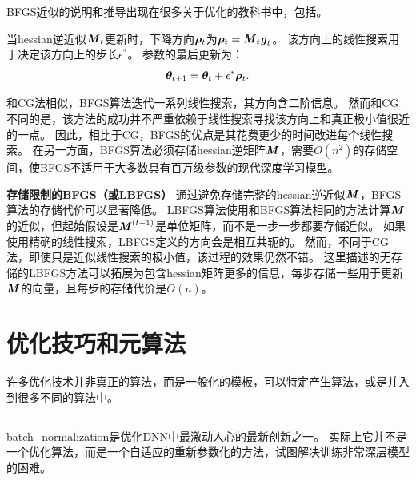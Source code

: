 
\gls{BFGS}近似的说明和推导出现在很多关于优化的教科书中，包括\cite{Lue84}。

当\gls{hessian}逆近似$\boldsymbol{\mathit{M}}_t$更新时，下降方向$\boldsymbol{\rho}_t$为$\boldsymbol{\rho}_t = \boldsymbol{\mathit{M}}_t \boldsymbol{\mathit{g}}_t$。
该方向上的线性搜索用于决定该方向上的步长$\epsilon^*$。
参数的最后更新为：
\begin{equation}
    \boldsymbol{\theta}_{t+1} = \boldsymbol{\theta}_t + \epsilon^* \boldsymbol{\rho}_t.
\end{equation}

和\gls{CG}法相似，\gls{BFGS}算法迭代一系列线性搜索，其方向含二阶信息。
然而和\gls{CG}不同的是，该方法的成功并不严重依赖于线性搜索寻找该方向上和真正极小值很近的一点。
因此，相比于\gls{CG}，\gls{BFGS}的优点是其花费更少的时间改进每个线性搜索。
在另一方面，\gls{BFGS}算法必须存储\gls{hessian}逆矩阵$\boldsymbol{\mathit{M}}$，需要$O(n^2)$的存储空间，使\gls{BFGS}不适用于大多数具有百万级参数的现代深度学习模型。

\textbf{存储限制的\gls{BFGS}（或\gls{LBFGS}）}
通过避免存储完整的\gls{hessian}逆近似$\boldsymbol{\mathit{M}}$，\gls{BFGS}算法的存储代价可以显著降低。
\gls{LBFGS}算法使用和\gls{BFGS}算法相同的方法计算$\boldsymbol{\mathit{M}}$的近似，但起始假设是$\boldsymbol{\mathit{M}}^{(t-1)}$是单位矩阵，而不是一步一步都要存储近似。
如果使用精确的线性搜索，\gls{LBFGS}定义的方向会是相互共轭的。
然而，不同于\gls{CG}法，即使只是近似线性搜索的极小值，该过程的效果仍然不错。
这里描述的无存储的\gls{LBFGS}方法可以拓展为包含\gls{hessian}矩阵更多的信息，每步存储一些用于更新$\boldsymbol{\mathit{M}}$的向量，且每步的存储代价是$O(n)$。


\section{优化技巧和元算法}
\label{sec:optimization_strategies_and_meta_algorithms}
许多优化技术并非真正的算法，而是一般化的模板，可以特定产生算法，或是并入到很多不同的算法中。

\subsection{}
\label{sec:batch_normalization}
\gls{batch_normalization}\citep{Ioffe+Szegedy-2015}是优化\gls{DNN}中最激动人心的最新创新之一。
实际上它并不是一个优化算法，而是一个自适应的重新参数化的方法，试图解决训练非常深层模型的困难。

